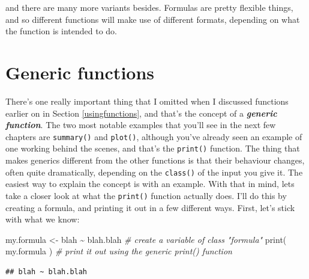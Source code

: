 \documentclass[
]{book}
\newenvironment{Shaded}{\begin{snugshade}}{\end{snugshade}}
\newcommand{\CommentTok}[1]{\textcolor[rgb]{0.56,0.35,0.01}{\textit{#1}}}
\newcommand{\FunctionTok}[1]{\textcolor[rgb]{0.00,0.00,0.00}{#1}}
\newcommand{\NormalTok}[1]{#1}
\newcommand{\OtherTok}[1]{\textcolor[rgb]{0.56,0.35,0.01}{#1}}
\newcommand{\SpecialCharTok}[1]{\textcolor[rgb]{0.00,0.00,0.00}{#1}}
\begin{document}
and there are many more variants besides. Formulas are pretty flexible things, and so different functions will make use of different formats, depending on what the function is intended to do.

\hypertarget{generics}{%
\section{Generic functions}\label{generics}}

There's one really important thing that I omitted when I discussed functions earlier on in Section \ref{usingfunctions}, and that's the concept of a \textbf{\emph{generic function}}. The two most notable examples that you'll see in the next few chapters are \texttt{summary()} and \texttt{plot()}, although you've already seen an example of one working behind the scenes, and that's the \texttt{print()} function. The thing that makes generics different from the other functions is that their behaviour changes, often quite dramatically, depending on the \texttt{class()} of the input you give it. The easiest way to explain the concept is with an example. With that in mind, lets take a closer look at what the \texttt{print()} function actually does. I'll do this by creating a formula, and printing it out in a few different ways. First, let's stick with what we know:

\begin{Shaded}
\begin{Highlighting}[]
\NormalTok{my.formula }\OtherTok{\textless{}{-}}\NormalTok{ blah }\SpecialCharTok{\textasciitilde{}}\NormalTok{ blah.blah    }\CommentTok{\# create a variable of class "formula"}
\FunctionTok{print}\NormalTok{( my.formula )               }\CommentTok{\# print it out using the generic print() function}
\end{Highlighting}
\end{Shaded}

\begin{verbatim}
## blah ~ blah.blah
\end{verbatim}
\end{document}
